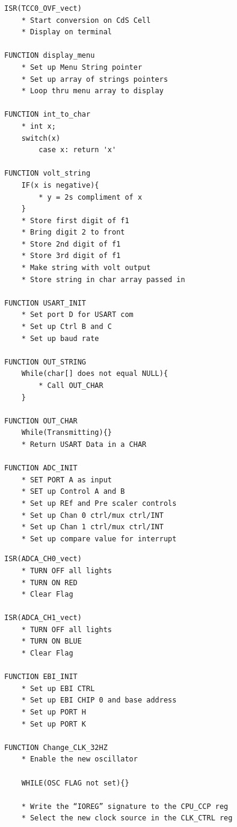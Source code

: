\documentclass[11pt]{article}
\theoremstyle{plain}
\theoremstyle{definition}
\begin{document}
\begin{tcolorbox}
\begin{verbatim}    
ISR(TCC0_OVF_vect)    
    * Start conversion on CdS Cell	
    * Display on terminal 
    
FUNCTION display_menu
	* Set up Menu String pointer
	* Set up array of strings pointers
	* Loop thru menu array to display

FUNCTION int_to_char
    * int x;
    switch(x)
        case x: return 'x'

FUNCTION volt_string
    IF(x is negative){
        * y = 2s compliment of x
    }
    * Store first digit of f1
    * Bring digit 2 to front
    * Store 2nd digit of f1
    * Store 3rd digit of f1
    * Make string with volt output
    * Store string in char array passed in

FUNCTION USART_INIT
    * Set port D for USART com
    * Set up Ctrl B and C
    * Set up baud rate

FUNCTION OUT_STRING
    While(char[] does not equal NULL){
        * Call OUT_CHAR
    }

FUNCTION OUT_CHAR
    While(Transmitting){}
    * Return USART Data in a CHAR
 
FUNCTION ADC_INIT
    * SET PORT A as input
    * SET up Control A and B
    * Set up REf and Pre scaler controls
    * Set up Chan 0 ctrl/mux ctrl/INT
    * Set up Chan 1 ctrl/mux ctrl/INT
	* Set up compare value for interrupt
\end{verbatim}
\end{tcolorbox}


\begin{tcolorbox}
\begin{verbatim}
ISR(ADCA_CH0_vect)
    * TURN OFF all lights
    * TURN ON RED
	* Clear Flag
	
ISR(ADCA_CH1_vect)
	* TURN OFF all lights
	* TURN ON BLUE
	* Clear Flag
	
FUNCTION EBI_INIT
    * Set up EBI CTRL
    * Set up EBI CHIP 0 and base address 
    * Set up PORT H
    * Set up PORT K	

FUNCTION Change_CLK_32HZ
    * Enable the new oscillator

    WHILE(OSC FLAG not set){}

    * Write the “IOREG” signature to the CPU_CCP reg
    * Select the new clock source in the CLK_CTRL reg    
\end{verbatim}
\end{tcolorbox}
\end{document}
